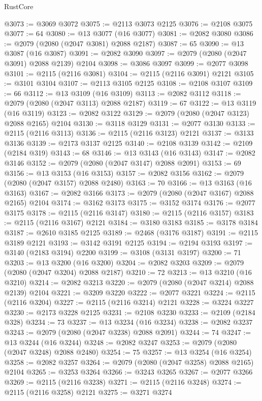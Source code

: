 \begin{lexlean}{RustCore}
\begin{coremodule}
@3073 := @3069 @3072
@3075 := @2113 @3073 @2125
@3076 := @2108 @3075
@3077 := 64
@3080 := @13 @3077 (@16 @3077)
@3081 := @2082 @3080
@3086 := @2079 (@2080 (@2047 @3081) @2088 @2187)
@3087 := 65
@3090 := @13 @3087 (@16 @3087)
@3091 := @2082 @3090
@3097 := @2079 (@2080 (@2047 @3091) @2088 @2139) @2104
@3098 := @3086 @3097
@3099 := @2077 @3098
@3101 := @2115 (@2116 @3081)
@3104 := @2115 (@2116 @3091) @2121
@3105 := @3101 @3104
@3107 := @2113 @3105 @2125
@3108 := @2108 @3107
@3109 := 66
@3112 := @13 @3109 (@16 @3109)
@3113 := @2082 @3112
@3118 := @2079 (@2080 (@2047 @3113) @2088 @2187)
@3119 := 67
@3122 := @13 @3119 (@16 @3119)
@3123 := @2082 @3122
@3129 := @2079 (@2080 (@2047 @3123) @2088 @2165) @2104
@3130 := @3118 @3129
@3131 := @2077 @3130
@3133 := @2115 (@2116 @3113)
@3136 := @2115 (@2116 @3123) @2121
@3137 := @3133 @3136
@3139 := @2173 @3137 @2125
@3140 := @2108 @3139
@3142 := @2109 (@2184 @319)
@3143 := 68
@3146 := @13 @3143 (@16 @3143)
@3147 := @2082 @3146
@3152 := @2079 (@2080 (@2047 @3147) @2088 @2091)
@3153 := 69
@3156 := @13 @3153 (@16 @3153)
@3157 := @2082 @3156
@3162 := @2079 (@2080 (@2047 @3157) @2088 @2480)
@3163 := 70
@3166 := @13 @3163 (@16 @3163)
@3167 := @2082 @3166
@3173 := @2079 (@2080 (@2047 @3167) @2088 @2165) @2104
@3174 := @3162 @3173
@3175 := @3152 @3174
@3176 := @2077 @3175
@3178 := @2115 (@2116 @3147)
@3180 := @2115 (@2116 @3157)
@3183 := @2115 (@2116 @3167) @2121
@3184 := @3180 @3183
@3185 := @3178 @3184
@3187 := @2610 @3185 @2125
@3189 := @2468 (@3176 @3187)
@3191 := @2115 @3189 @2121
@3193 := @3142 @3191 @2125
@3194 := @2194 @3193
@3197 := @3140 (@2183 @3194) @2200
@3199 := @3108 (@3131 @3197)
@3200 := 71
@3203 := @13 @3200 (@16 @3200)
@3204 := @2082 @3203
@3209 := @2079 (@2080 (@2047 @3204) @2088 @2187)
@3210 := 72
@3213 := @13 @3210 (@16 @3210)
@3214 := @2082 @3213
@3220 := @2079 (@2080 (@2047 @3214) @2088 @2139) @2104
@3221 := @3209 @3220
@3222 := @2077 @3221
@3224 := @2115 (@2116 @3204)
@3227 := @2115 (@2116 @3214) @2121
@3228 := @3224 @3227
@3230 := @2173 @3228 @2125
@3231 := @2108 @3230
@3233 := @2109 (@2184 @328)
@3234 := 73
@3237 := @13 @3234 (@16 @3234)
@3238 := @2082 @3237
@3243 := @2079 (@2080 (@2047 @3238) @2088 @2091)
@3244 := 74
@3247 := @13 @3244 (@16 @3244)
@3248 := @2082 @3247
@3253 := @2079 (@2080 (@2047 @3248) @2088 @2480)
@3254 := 75
@3257 := @13 @3254 (@16 @3254)
@3258 := @2082 @3257
@3264 := @2079 (@2080 (@2047 @3258) @2088 @2165) @2104
@3265 := @3253 @3264
@3266 := @3243 @3265
@3267 := @2077 @3266
@3269 := @2115 (@2116 @3238)
@3271 := @2115 (@2116 @3248)
@3274 := @2115 (@2116 @3258) @2121
@3275 := @3271 @3274

\end{coremodule}
\end{lexlean}
